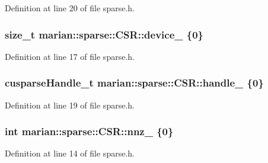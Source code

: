 Definition at line 20 of file sparse.\+h.

\subsubsection[{\texorpdfstring{device\+\_\+}{device_}}]{\setlength{\rightskip}{0pt plus 5cm}size\+\_\+t marian\+::sparse\+::\+C\+S\+R\+::device\+\_\+ \{0\}\hspace{0.3cm}{\ttfamily [private]}}\hypertarget{classmarian_1_1sparse_1_1CSR_a9466b731ae5e8bebd9713b8d6651dc41}{}\label{classmarian_1_1sparse_1_1CSR_a9466b731ae5e8bebd9713b8d6651dc41}


Definition at line 17 of file sparse.\+h.

\subsubsection[{\texorpdfstring{handle\+\_\+}{handle_}}]{\setlength{\rightskip}{0pt plus 5cm}cusparse\+Handle\+\_\+t marian\+::sparse\+::\+C\+S\+R\+::handle\+\_\+ \{0\}\hspace{0.3cm}{\ttfamily [private]}}\hypertarget{classmarian_1_1sparse_1_1CSR_a3bfb6efc65c5b85247ca0cd2a8863c00}{}\label{classmarian_1_1sparse_1_1CSR_a3bfb6efc65c5b85247ca0cd2a8863c00}


Definition at line 19 of file sparse.\+h.

\subsubsection[{\texorpdfstring{nnz\+\_\+}{nnz_}}]{\setlength{\rightskip}{0pt plus 5cm}int marian\+::sparse\+::\+C\+S\+R\+::nnz\+\_\+ \{0\}\hspace{0.3cm}{\ttfamily [private]}}\hypertarget{classmarian_1_1sparse_1_1CSR_a567e83de09f28445aa97c6374477b8fa}{}\label{classmarian_1_1sparse_1_1CSR_a567e83de09f28445aa97c6374477b8fa}


Definition at line 14 of file sparse.\+h.

